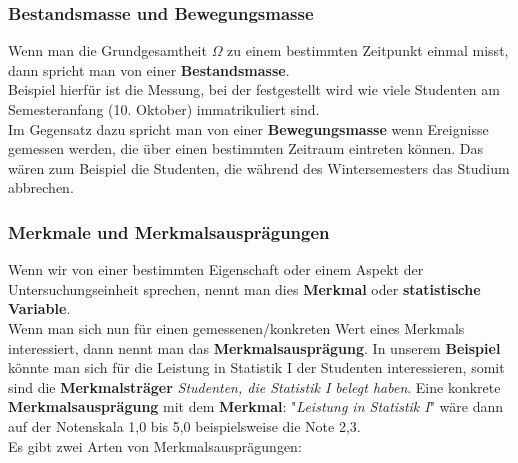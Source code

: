 \documentclass[a4paper]{article}
\begin{document}
\subsubsection{Bestandsmasse und Bewegungsmasse}
 Wenn man die Grundgesamtheit $\Omega$ zu einem bestimmten Zeitpunkt einmal misst, dann spricht man von einer \textbf{Bestandsmasse}.\\
 Beispiel hierfür ist die Messung, bei der festgestellt wird wie viele Studenten am Semesteranfang (10. Oktober) immatrikuliert sind.\\
Im Gegensatz dazu spricht man von einer \textbf{Bewegungsmasse} wenn Ereignisse gemessen werden, die über einen bestimmten Zeitraum eintreten können. Das wären zum Beispiel die Studenten, die während des Wintersemesters das Studium abbrechen.

\subsubsection{Merkmale und Merkmalsausprägungen}
Wenn wir von einer bestimmten Eigenschaft oder einem Aspekt der Untersuchungseinheit sprechen, nennt man dies \textbf{Merkmal} oder \textbf{statistische Variable}.
\\Wenn man sich nun für einen gemessenen/konkreten Wert eines Merkmals interessiert, dann nennt man das \textbf{Merkmalsausprägung}.
In unserem \textbf{Beispiel} könnte man sich für die Leistung in Statistik I der Studenten interessieren, somit sind die \textbf{Merkmalstr\"ager} \textit{Studenten, die Statistik I belegt haben}.
Eine konkrete \textbf{Merkmalsausprägung} mit dem \textbf{Merkmal}: "\textit{Leistung in Statistik I}"  wäre dann auf der Notenskala 1,0 bis 5,0 beispielsweise die Note 2,3.\\
Es gibt zwei Arten von Merkmalsausprägungen:
\end{document}
